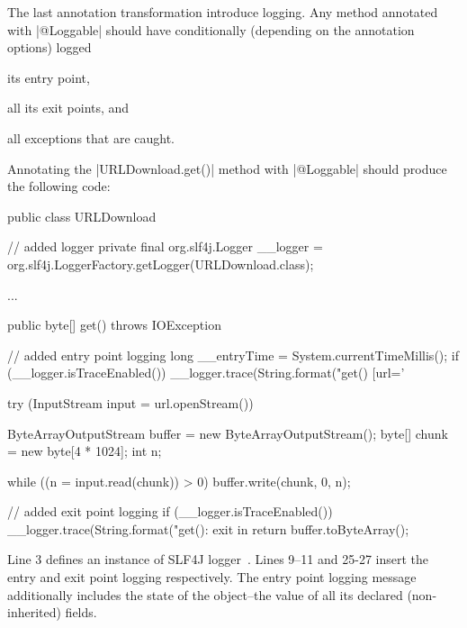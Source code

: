 The last annotation transformation introduce logging.
Any method annotated with \javainline|@Loggable| should have conditionally (depending on the annotation options) logged
\begin{inparaenum}[(i)]
\item its entry point, 
\item all its exit points, and 
\item all exceptions that are caught. 
\end{inparaenum}

Annotating the \javainline|URLDownload.get()| method with \javainline|@Loggable| should produce the following code:
%
\begin{javacode}
public class URLDownload {
  // added logger
  private final org.slf4j.Logger __logger = org.slf4j.LoggerFactory.getLogger(URLDownload.class);

  ...

  public byte[] get() throws IOException {
    // added entry point logging
    long __entryTime = System.currentTimeMillis();
    if (__logger.isTraceEnabled()) {
      __logger.trace(String.format("get() [url='%
    }

    try (InputStream input = url.openStream()) {

      ByteArrayOutputStream buffer = new ByteArrayOutputStream();
      byte[] chunk = new byte[4 * 1024];
      int n;

      while ((n = input.read(chunk)) > 0) {
        buffer.write(chunk, 0, n);
      }

      // added exit point logging
      if (__logger.isTraceEnabled()) {
        __logger.trace(String.format("get(): exit in %
      }
      return buffer.toByteArray();
    }
  }
}
\end{javacode}

Line 3 defines an instance of SLF4J logger~\cite{slf4j}.
Lines 9--11 and 25-27 insert the entry and exit point logging respectively.
The entry point logging message additionally includes the state of the object--\Ie the value of all its declared (non-inherited) fields.

